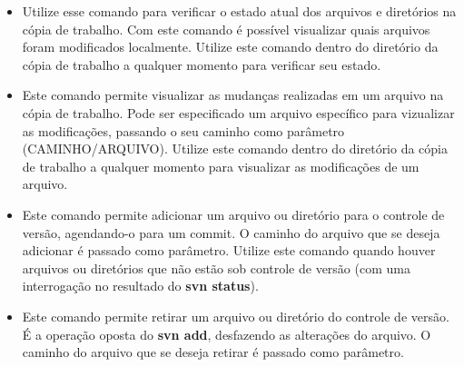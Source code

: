 \begin{itemize}
 \item \colorbox{Gray}{
	\begin{minipage}{.15\linewidth}
	\end{minipage}
	}

    \subitem Utilize esse comando para verificar o estado atual dos arquivos e diretórios na cópia de trabalho.
	     Com este comando é possível visualizar quais arquivos foram modificados localmente.
	     Utilize este comando dentro do diretório da cópia de trabalho a qualquer momento para verificar seu estado.


\item \colorbox{Gray}{
	\begin{minipage}{.53\linewidth}
	\end{minipage}
	}

    \subitem Este comando permite visualizar as mudanças realizadas em um arquivo na cópia de trabalho.
	     Pode ser especificado um arquivo específico para vizualizar as modificações, passando o seu caminho como
	     parâmetro (CAMINHO/ARQUIVO).
	     Utilize este comando dentro do diretório da cópia de trabalho a qualquer momento para visualizar as modificações
	     de um arquivo.

\item \colorbox{Gray}{
	\begin{minipage}{.53\linewidth}
	\end{minipage}
	}

    \subitem Este comando permite adicionar um arquivo ou diretório para o controle de versão, agendando-o para um commit.
	     O caminho do arquivo que se deseja adicionar é passado como parâmetro.
	     Utilize este comando quando houver arquivos ou diretórios que não estão sob controle de versão
	     (com uma interrogação no resultado do \textbf{svn status}).

\item \colorbox{Gray}{
	\begin{minipage}{.57\linewidth}
	\end{minipage}
	}

    \subitem Este comando permite retirar um arquivo ou diretório do controle de versão.
	     É a operação oposta do \textbf{svn add}, desfazendo as alterações do arquivo.
	     O caminho do arquivo que se deseja retirar é passado como parâmetro.


\end{itemize}
